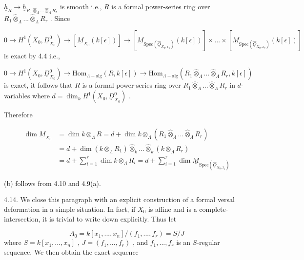 $\underline{h}_R \to \underline{h}_{R_1 \widehat{\otimes}_\Lambda ... \widehat{\otimes}_\Lambda R_r}$   is smooth i.e.,  $R$  is a formal power-series ring over  $R_1 \widehat{\otimes}_\Lambda ... \widehat{\otimes}_\Lambda R_r$ . Since

\begin{equation*}
0 \to H^1(X_0,\underline{D}^0_{X_0}) \to [\underline{M}_{X_0}(k[\epsilon])] \to [\underline{M}_{\mathrm{Spec}(\widehat{\underline{O}}_{X_0,x_1})}(k[\epsilon])] \times ... \times [\underline{M}_{\mathrm{Spec}(\widehat{\underline{O}}_{X_0,x_r})}(k[\epsilon])]
\end{equation*}
is exact by 4.4 i.e.,

\begin{equation*}
0 \to H^1(X_0, \underline{D}^0_{X_0}) \to \mathrm{Hom}_{\Lambda-\mathrm{alg}}(R, k[\epsilon]) \to \mathrm{Hom}_{\Lambda-\mathrm{alg}}(R_1 \widehat{\otimes}_\Lambda ... \widehat{\otimes}_\Lambda R_r, k[\epsilon])
\end{equation*}
is exact, it follows that  $R$  is a formal power-series ring over    $R_1 \widehat{\otimes}_\Lambda ... \widehat{\otimes}_\Lambda R_r$ in $d$-variables where  $d = \dim_k H^1(X_0, \underline{D}^0_{X_0})$  .

Therefore

\begin{equation*}
\begin{aligned}
\dim \underline{M}_{X_0} &= \dim k \otimes_\Lambda R = d + \dim k \otimes_\Lambda (R_1 \widehat{\otimes}_\Lambda ... \widehat{\otimes}_\Lambda R_r) \\
&= d + \dim(k \otimes_\Lambda R_1) \widehat{\otimes}_k ... \widehat{\otimes}_k (k \otimes_\Lambda R_r) \\
&= d + \sum_{i=1}^{r} \dim k \otimes_\Lambda R_i = d + \sum_{i=1}^{r} \dim \underline{M}_{\mathrm{Spec}(\widehat{\underline{O}}_{X_0,x_i})}
\end{aligned}
\end{equation*}


(b)  follows from 4.10 and 4.9(a).

4.14.    We close this paragraph with an explicit construction of a formal versal deformation in a simple situation. In fact, if  $X_0$  is affine and is a complete-intersection, it is trivial to write down explicitly. Thus let

\begin{equation*}
A_0 = k[x_1,...,x_n]/(f_1,...,f_r) = S/J
\end{equation*}
where  $S = k[x_1,...,x_n]$  ,  $J = (f_1,...,f_r)$  , and  $f_1,...,f_r$  is an $S$-regular sequence. We then obtain the exact sequence

